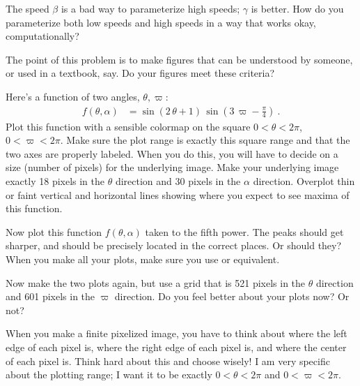 \documentclass[12pt]{article}
\begin{document}
\begin{note}
  The speed $\beta$ is a bad way to parameterize high speeds; $\gamma$ is better.
  How do you parameterize both low speeds and high speeds in a way that works okay, computationally?
\end{note}

\begin{note}
  The point of this problem is to make figures that can be understood by someone, or used in a textbook, say.
  Do your figures meet these criteria?
\end{note}

\begin{problem}
  Here's a function of two angles, $\theta,\varpi$:
  \begin{align}
    f(\theta,\alpha) &= \sin(2\,\theta + 1)\,\sin(3\,\varpi - \frac{\pi}{4}) ~.
  \end{align}
  \subpart Plot this function with a sensible colormap on the square $0<\theta<2\pi$, $0<\varpi<2\pi$.
  Make sure the plot range is exactly this square range and that the two axes are properly labeled.
  When you do this, you will have to decide on a size (number of pixels) for the underlying image.
  Make your underlying image exactly 18 pixels in the $\theta$ direction and 30 pixels in the $\alpha$ direction.
  Overplot thin or faint vertical and horizontal lines showing where you expect to see maxima of this function.

  \subpart Now plot this function $f(\theta,\alpha)$ taken to the fifth power.
  The peaks should get sharper, and should be precisely located in the correct places.
  Or should they?
  When you make all your plots, make sure you use  or equivalent.

  \subpart Now make the two plots again, but use a grid that is 521 pixels in the $\theta$ direction and 601 pixels in the $\varpi$ direction.
  Do you feel better about your plots now? Or not?
\end{problem}

\begin{note}
  When you make a finite pixelized image, you have to think about where the left edge of each pixel is, where the right edge of each pixel is, and where the center of each pixel is.
  Think hard about this and choose wisely!
  I am very specific about the plotting range; I want it to be exactly $0<\theta<2\pi$ and $0<\varpi<2\pi$.
\end{note}
\end{document}
